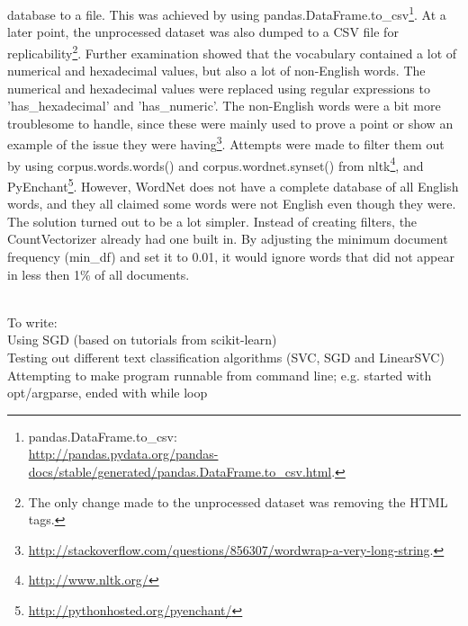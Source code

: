 database to a file. This was achieved by using pandas.DataFrame.to\_csv\footnote{pandas.DataFrame.to\_csv: \\
	\url{http://pandas.pydata.org/pandas-docs/stable/generated/pandas.DataFrame.to_csv.html}.}. At a later point, 
the unprocessed dataset was also dumped to a CSV file for replicability\footnote{The only change made to the 
	unprocessed dataset was removing the HTML tags.}.
\vspace{0.5em}\newline
Further examination showed that the vocabulary contained a lot of numerical and hexadecimal values, but also 
a lot of non-English words. The numerical and hexadecimal values were replaced using regular expressions to 
'has\_hexadecimal' and 'has\_numeric'. The non-English words were a bit more troublesome to handle, since 
these were mainly used to prove a point or show an example of the issue they were having\footnote{ 
	\url{http://stackoverflow.com/questions/856307/wordwrap-a-very-long-string}.}. Attempts were made to filter 
them out by using corpus.words.words() and 
corpus.wordnet.synset() from \gls{nltk}\footnote{\url{http://www.nltk.org/}}, and 
PyEnchant\footnote{\url{http://pythonhosted.org/pyenchant/}}. However, WordNet does not have a complete database 
of all English words, and they all claimed some words were not English even though they were.
\vspace{0.5em}\newline
The solution turned out to be a lot simpler. Instead of creating filters, the CountVectorizer already had one 
built in. By adjusting the minimum document frequency (min\_df) and set it to 0.01, it would ignore words 
that did not appear in less then 1\% of all documents.

~\\
To write: \\
Using SGD (based on tutorials from scikit-learn) \\
Testing out different text classification algorithms (SVC, SGD and LinearSVC) \\
Attempting to make program runnable from command line; e.g. started with opt/argparse, ended with while loop


